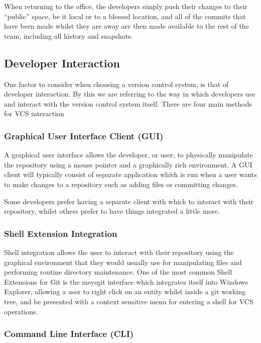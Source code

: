 When returning to the office, the developers simply push their changes to their ``public'' space, be it local or to a blessed location, and all of the commits that have been made whilst they are away are then made available to the rest of the team, including all history and snapshots.

\subsection{Developer Interaction}

One factor to consider when choosing a version control system, is that of developer interaction.
By this we are referring to the way in which developers use and interact with the version control system itself.
There are four main methods for VCS interaction

\subsubsection{Graphical User Interface Client (GUI)}

A graphical user interface allows the developer, or user, to physically manipulate the repository using a mouse pointer and a graphically rich environment.
A GUI client will typically consist of separate application which is run when a user wants to make changes to a repository such as adding files or committing changes.

Some developers prefer having a separate client with which to interact with their repository, whilst others prefer to have things integrated a little more.

\subsubsection{Shell Extension Integration}

Shell integration allows the user to interact with their repository using the graphical environment that they would usually use for manipulating files and performing routine directory maintenance.
One of the most common Shell Extensions for Git is the msysgit interface which integrates itself into Windows Explorer, allowing a user to right click on an entity whilst inside a git working tree, and be presented with a context sensitive menu for entering a shell for VCS operations.

\subsubsection{Command Line Interface (CLI)}

